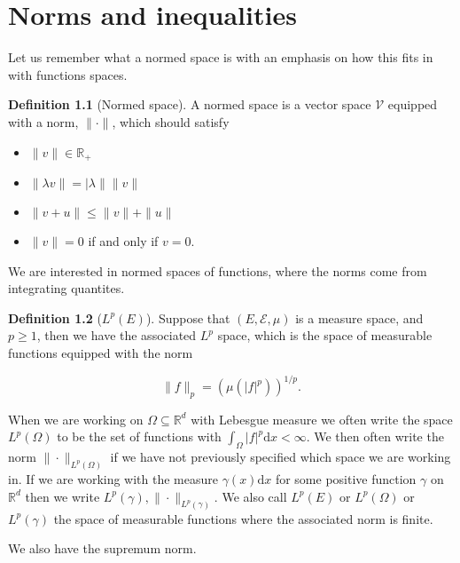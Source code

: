 \documentclass[
]{book}
\providecommand{\tightlist}{%
  \setlength{\itemsep}{0pt}\setlength{\parskip}{0pt}}
\theoremstyle{definition}
\newtheorem{definition}{Definition}[chapter]
\theoremstyle{definition}
\theoremstyle{definition}
\theoremstyle{definition}
\theoremstyle{remark}
\begin{document}
\hypertarget{norms-and-inequalities}{%
\chapter{Norms and inequalities}\label{norms-and-inequalities}}

Let us remember what a normed space is with an emphasis on how this fits in with functions spaces.

\begin{definition}[Normed space]

A normed space is a vector space \(\mathcal{V}\) equipped with a norm, \(\|\cdot\|\), which should satisfy

\begin{itemize}
\tightlist
\item
  \(\| v\| \in \mathbb{R}_+\)
\item
  \(\| \lambda v\| = |\lambda\| \|v\|\)
\item
  \(\|v+u\| \leq \|v\| + \|u\|\)
\item
  \(\|v\|=0\) if and only if \(v=0\).
\end{itemize}

\end{definition}

We are interested in normed spaces of functions, where the norms come from integrating quantites.

\begin{definition}[$L^p(E)$]
Suppose that \((E, \mathcal{E}, \mu)\) is a measure space, and \(p \geq 1\), then we have the associated \(L^p\) space, which is the space of measurable functions equipped with the norm

\[\| f\|_p = \left( \mu(|f|^p)\right)^{1/p}. \]

When we are working on \(\Omega \subseteq \mathbb{R}^d\) with Lebesgue measure we often write the space \(L^p(\Omega)\) to be the set of functions with \(\int_\Omega |f|^p \mathrm{d}x < \infty\). We then often write the norm \(\| \cdot\|_{L^p(\Omega)}\) if we have not previously specified which space we are working in. If we are working with the measure \(\gamma(x) \mathrm{d}x\) for some positive function \(\gamma\) on \(\mathbb{R}^d\) then we write \(L^p(\gamma), \| \cdot\|_{L^p(\gamma)}\). We also call \(L^p(E)\) or \(L^p(\Omega)\) or \(L^p(\gamma)\) the space of measurable functions where the associated norm is finite.
\end{definition}

We also have the supremum norm.
\end{document}
